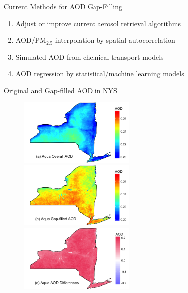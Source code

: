 \documentclass[handout]{beamer} %
\begin{document}
\begin{frame}{Current Methods for AOD Gap-Filling}
    \begin{enumerate}
        \item Adjust or improve current aerosol retrieval algorithms
        \item AOD/PM$_{2.5}$ interpolation by spatial autocorrelation
        \item Simulated AOD from chemical transport models
        \item AOD regression by statistical/machine learning models
    \end{enumerate}
\end{frame}

\begin{frame}{Original and Gap-filled AOD in NYS}
    \begin{figure}
        \centering
        \includegraphics[width=0.5\textwidth]{img/appendix/Aim1/figure21.png}
        \includegraphics[width=0.5\textwidth]{img/appendix/Aim1/figure22.png} \\
        \includegraphics[width=0.5\textwidth]{img/appendix/Aim1/figure25.png}
    \end{figure}
\end{frame}
\end{document}
